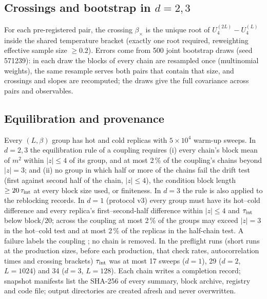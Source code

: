 \subsection{\texorpdfstring{Crossings and bootstrap in $d=2,3$}{Crossings and bootstrap in d=2,3}}
For each pre-registered pair, the crossing $\beta_\times$ is the unique root of $U_4^{(2L)}-U_4^{(L)}$ inside the shared temperature bracket
(exactly one root required, reweighting effective sample size $\ge0.2$). Errors come from 500 joint bootstrap draws (seed 571239): in each draw the blocks of every chain are resampled once (multinomial
weights), the same resample serves both pairs that contain that size, and crossings and slopes are recomputed; the draws give the full covariance across pairs and
observables.

\subsection{Equilibration and provenance}
Every $(L,\beta)$ group has hot and cold replicas with $5\times10^4$ warm-up sweeps. In $d=2,3$ the equilibration rule of a coupling requires
(i) every chain's block mean of $m^2$ within $|z|\le4$ of its group, and at most 2\,\% of the coupling's chains beyond $|z|=3$; and (ii) no
group in which half or more of the chains fail the drift test (first against second half of the chain, $|z|\le4$), the condition block
length $\ge20\,\tau_{\rm int}$ at every block size used, or finiteness. In $d=3$ the rule is also applied to the reblocking records. In $d=1$
(protocol v3) every group must have its hot--cold difference and every replica's first--second-half difference within $|z|\le4$ and
$\tau_{\rm int}$ below block$/20$; across the coupling at most 2\,\% of the groups may exceed $|z|=3$ in the hot--cold test and at most 2\,\% of
the replicas in the half-chain test. A failure labels the coupling ; no chain is removed. In the preflight runs
(short runs at the production sizes, before each production, that check rates, autocorrelation times and crossing brackets) $\tau_{\rm int}$
was at most 17 sweeps ($d=1$), 29 ($d=2$, $L=1024$) and 34 ($d=3$, $L=128$). Each chain writes a
completion record; snapshot manifests list the SHA-256 of every summary, block archive, registry and code file; output directories are
created afresh and never overwritten.


